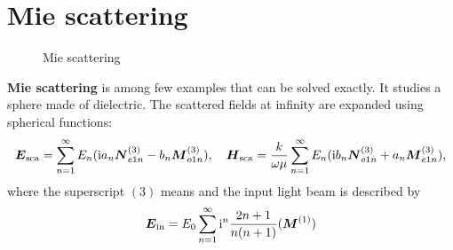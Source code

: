 \documentclass[hyperref, a4paper]{article}
\newcommand*{\ii}{\mathrm{i}}
\newcommand*{\concept}[1]{{\textbf{#1}}}
\begin{document}
\section{Mie scattering}

\begin{figure}
    \centering
    
    \caption{Mie scattering}
\end{figure}

\concept{Mie scattering} is among few examples that can be solved exactly. It studies a sphere made of 
dielectric. The scattered fields at infinity are expanded using spherical functions:
\begin{equation}
    \vb*{E}_\text{sca} = \sum_{n=1}^\infty E_n (\ii a_n \vb*{N}^{(3)}_{e1n} - b_n \vb*{M}^{(3)}_{o1n}), \quad 
    \vb*{H}_\text{sca} = \frac{k}{\omega \mu} \sum_{n=1}^\infty E_n (\ii b_n \vb*{N}^{(3)}_{o1n} + a_n \vb*{M}^{(3)}_{e1n}),
\end{equation}
where the superscript $(3)$ means %
and the input light beam is described by 
\begin{equation}
    \vb*{E}_\text{in} = E_0 \sum_{n=1}^\infty \ii^n \frac{2n+1}{n(n+1)} (\vb*{M}^{(1)})
\end{equation}
\end{document}
